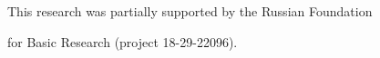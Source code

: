 




\Ack


\noindent


This research was partially supported by the Russian Foundation 


for Basic Research (project   18-29-22096).








 








\vspace*{6pt}





